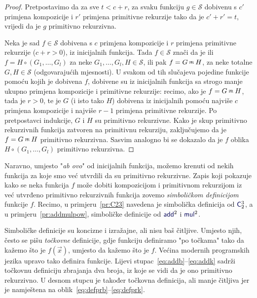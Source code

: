 \begin{proof}
Pretpostavimo da za sve $t<c+r$, za svaku funkciju $g\in\mathcal S$ dobivenu s $c'$ primjena kompozicije i $r'$ primjena primitivne rekurzije tako da je $c'+r'=t$, vrijedi da je $g$ primitivno rekurzivna.

    Neka je sad $f\in\mathcal S$ dobivena s $c$ primjena kompozicije i $r$ primjena primitivne rekurzije ($c+r>0$), iz inicijalnih funkcija. Tada $f\in\mathcal S$ znači da je ili $f=H\circ(G_1,\dotsc,G_l)$ za neke $G_1,\dotsc,G_l,H\in\mathcal S$, ili pak $f=G\pr H$, za neke totalne $G,H\in\mathcal S$ (odgovarajućih mjesnosti). U svakom od tih slučajeva pojedine funkcije pomoću kojih je dobivena $f$, dobivene su iz inicijalnih funkcija sa strogo manje ukupno primjena kompozicije i primitivne rekurzije: recimo, ako je $f=G\pr H$, tada je $r>0$, te je $G$ (i isto tako $H$) dobivena iz inicijalnih pomoću najviše $c$ primjena kompozicije i najviše $r-1$ primjena primitivne rekurzije. Po pretpostavci indukcije, $G$ i $H$ su primitivno rekurzivne. Kako je skup primitivno rekurzivnih funkcija zatvoren na primitivnu rekurziju, zaključujemo da je $f=G\pr H$ primitivno rekurzivna. Sasvim analogno bi se dokazalo da je $f$ oblika $H\circ(G_1,\dotsc,G_l)$ primitivno rekurzivna.
\end{proof}

\begin{napomena}\label{nap:symbdef}
Naravno, umjesto "\emph{ab ovo}" od inicijalnih funkcija, možemo krenuti od nekih funkcija za koje smo već utvrdili da su primitivno rekurzivne. Zapis koji pokazuje kako se neka funkcija $f$ može dobiti kompozicijom i primitivnom rekurzijom iz već utvrđeno primitivno rekurzivnih funkcija zovemo \emph{simboličkom definicijom} funkcije $f$. Recimo, u primjeru~\ref{pr:C23} navedena je simbolička definicija od $\f C_2^3$, a u primjeru~\ref{pr:addmulpow}, simboličke definicije od $\f{add}^2$ i $\f{mul}^2$.
\end{napomena}

Simboličke definicije su koncizne i izražajne, ali nisu baš čitljive. Umjesto njih, često se pišu \emph{točkovne} definicije, gdje funkciju definiramo "po točkama" tako da kažemo što je $f(\vec x)$, umjesto da kažemo što je $f$. Većina modernih programskih jezika upravo tako definira funkcije. Lijevi stupac~\eqref{eq:addb}--\eqref{eq:addk} sadrži točkovnu definiciju zbrajanja dva broja, iz koje se vidi da je ono primitivno rekurzivno. U desnom stupcu je također točkovna definicija, ali manje čitljiva jer je namještena na oblik~\eqref{eq:defprb}--\eqref{eq:defprk}.


